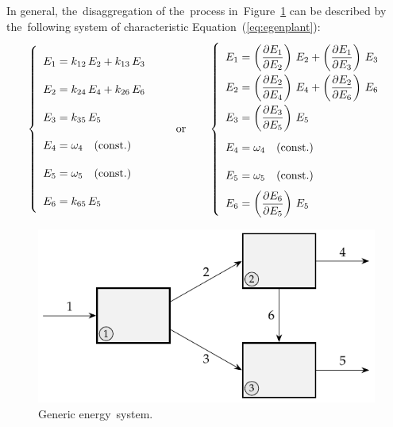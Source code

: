 \documentclass[energies,article,accept,moreauthors,pdftex]{Definitions/mdpi}
\newcommand{\dpartial}[2]{\left(\dfrac{\partial E_{#1}}{\partial E_{#2}}\right)}
\begin{document}
In general, the~disaggregation of the~process in~Figure~\ref{fig:genplant} can be described by the~following system of characteristic Equation~(\ref{eq:egenplant}):
\begin{equation}
    \def\arraystretch{2.1}
    \left\{\begin{array}{l}
        E_1=k_{12}\,E_2 + k_{13}\,E_3 \\
        E_2=k_{24}\,E_4 + k_{26}\,E_6 \\
        E_3=k_{35}\,E_5\\
        E_4=\omega_4 \quad \text{(const.)}\\
        E_5=\omega_5 \quad \text{(const.)}\\
        E_6=k_{65}\,E_5
    \end{array}\right.
    \qquad
    \text{or}
    \qquad
    \left\{\begin{array}{l}
        E_1=\dpartial{1}{2}\,E_2 + \dpartial{1}{3}\,E_3 \\
        E_2=\dpartial{2}{4}\,E_4 + \dpartial{2}{6}\,E_6 \\
        E_3=\dpartial{3}{5}\,E_5\\
        E_4=\omega_4 \quad \text{(const.)}\\
        E_5=\omega_5 \quad \text{(const.)}\\
        E_6=\dpartial{6}{5}\,E_5
    \end{array}\right.
    \label{eq:egenplant}
\end{equation}

\begin{figure}[H]
    \centering
    \includegraphics{genplant}
    \caption{Generic energy~system.}
    \label{fig:genplant}
\end{figure}
\end{document}
